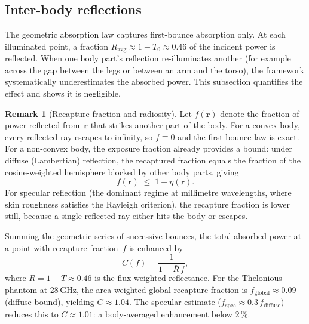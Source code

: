 \documentclass[11pt,a4paper]{article}
\theoremstyle{definition}      %
\newtheorem{remark}[remark]{Remark}
\newcommand{\rr}{\mathbf{r}}
\newcommand{\Tbar}{\bar{T}}
\begin{document}
\subsection{Inter-body reflections}\label{sec:inter-body}

The geometric absorption law captures first-bounce absorption only.  At each
illuminated point, a fraction $R_{\mathrm{avg}}\approx 1-T_0\approx
0.46$ of the incident power is reflected.  When one body part's
reflection re-illuminates another (for example across the gap between
the legs or between an arm and the torso), the framework systematically
underestimates the absorbed power.  This subsection quantifies the
effect and shows it is negligible.

\begin{remark}[Recapture fraction and radiosity]
Let $f(\rr)$ denote the fraction of power reflected from~$\rr$ that
strikes another part of the body.  For a convex body, every reflected
ray escapes to infinity, so $f\equiv 0$ and the first-bounce law is
exact.  For a non-convex body, the exposure fraction already provides
a bound: under diffuse (Lambertian) reflection, the recaptured
fraction equals the fraction of the cosine-weighted hemisphere blocked
by other body parts, giving
\begin{equation}\label{eq:f-bound}
  f(\rr)\;\le\;1-\eta(\rr).
\end{equation}
For specular reflection (the dominant regime at millimetre
wavelengths, where skin roughness satisfies the Rayleigh criterion), the
recapture fraction is lower still, because a single reflected ray
either hits the body or escapes.

Summing the geometric series of successive bounces, the total absorbed
power at a point with recapture fraction~$f$ is enhanced by
\begin{equation}\label{eq:radiosity-C}
  C(f) = \frac{1}{1-\bar R\,f},
\end{equation}
where $\bar R=1-\Tbar\approx 0.46$ is the flux-weighted reflectance.
For the Thelonious phantom at 28\,GHz, the area-weighted global
recapture fraction is $f_{\mathrm{global}}\approx 0.09$ (diffuse
bound), yielding $C\approx 1.04$.  The specular estimate
($f_{\mathrm{spec}}\approx 0.3\,f_{\mathrm{diffuse}}$) reduces this
to $C\approx 1.01$: a body-averaged enhancement below 2\,\%.
\end{remark}
\end{document}
